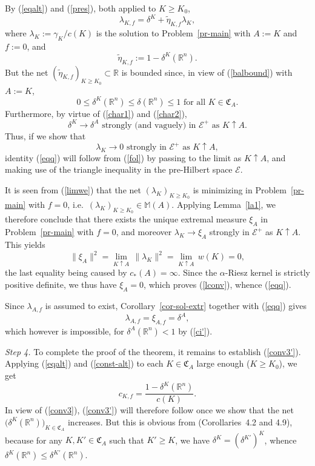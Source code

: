 \documentclass[12pt,a4paper,reqno]{amsart} %
\theoremstyle{lause}
\theoremstyle{maaritelma}
\theoremstyle{lause}
\theoremstyle{maaritelma}
\numberwithin{equation}{section}
\begin{document}
By (\ref{eqalt}) and (\ref{pres}), both applied to $K\geqslant K_0$,
\begin{equation}\label{fol}
\lambda_{K,f}=\delta^K+\widetilde{\eta}_{K,f}\lambda_K,
\end{equation}
where $\lambda_K:=\gamma_K/c(K)$ is the solution to Problem~\ref{pr-main} with $A:=K$ and $f:=0$, and
\[\widetilde{\eta}_{K,f}:=1-\delta^K(\mathbb R^n).\]
But the net $(\widetilde{\eta}_{K,f})_{K\geqslant K_0}\subset\mathbb R$ is bounded since, in view of (\ref{balbound}) with $A:=K$,
\[0\leqslant\delta^K(\mathbb R^n)\leqslant\delta(\mathbb R^n)\leqslant1\text{ \ for all $K\in\mathfrak C_A$}.\]
Furthermore, by virtue of (\ref{char1}) and (\ref{char2}),
\[\delta^K\to\delta^A\text{ \ strongly (and vaguely) in $\mathcal E^+$ as $K\uparrow A$}.\]
Thus, if we show that
\begin{equation}\label{lconv}
\lambda_K\to0\text{ \ strongly in $\mathcal E^+$ as $K\uparrow A$},
\end{equation}
identity (\ref{eqq}) will follow from (\ref{fol}) by passing to the limit as $K\uparrow A$, and making use of the triangle inequality in the pre-Hil\-bert space $\mathcal E$.

It is seen from (\ref{limwe}) that the net $(\lambda_K)_{K\geqslant K_0}$ is minimizing in Problem~\ref{pr-main} with $f=0$, i.e.\ $(\lambda_K)_{K\geqslant K_0}\in\mathbb M(A)$. Applying Lemma~\ref{la1}, we therefore conclude that there exists the unique extremal measure $\xi_A$ in Problem~\ref{pr-main} with $f=0$, and moreover $\lambda_K\to\xi_A$ strongly in $\mathcal E^+$ as $K\uparrow A$. This yields
\[\|\xi_A\|^2=\lim_{K\uparrow A}\,\|\lambda_K\|^2=\lim_{K\uparrow A}\,w(K)=0,\]
the last equality being caused by $c_*(A)=\infty$. Since the $\alpha$-Riesz kernel is strictly positive definite, we thus have $\xi_A=0$, which proves (\ref{lconv}), whence (\ref{eqq}).

Since $\lambda_{A,f}$ is assumed to exist, Corollary~\ref{cor-sol-extr} together with (\ref{eqq}) gives
\[\lambda_{A,f}=\xi_{A,f}=\delta^A,\]
which however is impossible, for $\delta^A(\mathbb R^n)<1$ by (\ref{ci'}).\smallskip

{\it Step 4.} To complete the proof of the theorem, it remains to establish (\ref{conv3'}). Applying (\ref{eqalt}) and (\ref{const-alt}) to each $K\in\mathfrak C_A$ large enough ($K\geqslant K_0$), we get
\[c_{K,f}=\frac{1-\delta^K(\mathbb R^n)}{c(K)}.\]
In view of (\ref{conv3}), (\ref{conv3'}) will therefore follow once we show that the net $\bigl(\delta^K(\mathbb R^n)\bigr)_{K\in\mathfrak C_A}$ increases. But this is obvious from \cite{Z-bal} (Corollaries~4.2 and 4.9), because for any $K,K'\in\mathfrak C_A$ such that $K'\geqslant K$, we have $\delta^K=(\delta^{K'})^K$, whence $\delta^K(\mathbb R^n)\leqslant\delta^{K'}(\mathbb R^n)$.
\end{document}
